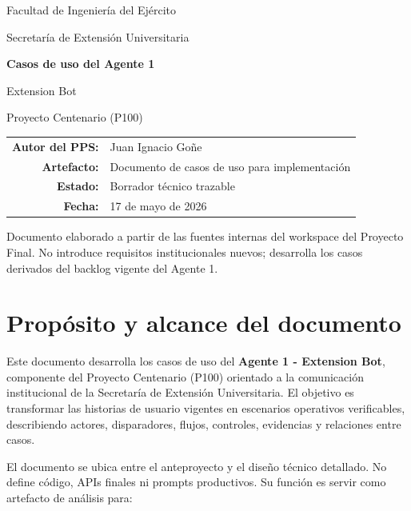 \documentclass[11pt,a4paper]{article}
\begin{document}

\begin{titlepage}
  \centering
  \vspace*{2.0cm}
  {\Large Facultad de Ingeniería del Ejército \par}
  \vspace{0.3cm}
  {\large Secretaría de Extensión Universitaria \par}
  \vspace{2.0cm}
  {\Huge\bfseries Casos de uso del Agente 1\par}
  \vspace{0.4cm}
  {\LARGE Extension Bot\par}
  \vspace{1.0cm}
  {\large Proyecto Centenario (P100)\par}
  \vspace{2.0cm}
  \begin{tabular}{rl}
    \textbf{Autor del PPS:} & Juan Ignacio Goñe \\
    \textbf{Artefacto:} & Documento de casos de uso para implementación \\
    \textbf{Estado:} & Borrador técnico trazable \\
    \textbf{Fecha:} & 17 de mayo de 2026 \\
  \end{tabular}
  \vfill
  {\small Documento elaborado a partir de las fuentes internas del workspace del Proyecto Final. No introduce requisitos institucionales nuevos; desarrolla los casos derivados del backlog vigente del Agente 1. \par}
\end{titlepage}

\tableofcontents
\clearpage
{}

\section{Propósito y alcance del documento}

Este documento desarrolla los casos de uso del \textbf{Agente 1 - Extension Bot}, componente del Proyecto Centenario (P100) orientado a la comunicación institucional de la Secretaría de Extensión Universitaria. El objetivo es transformar las historias de usuario vigentes en escenarios operativos verificables, describiendo actores, disparadores, flujos, controles, evidencias y relaciones entre casos.

El documento se ubica entre el anteproyecto y el diseño técnico detallado. No define código, APIs finales ni prompts productivos. Su función es servir como artefacto de análisis para:
\end{document}
